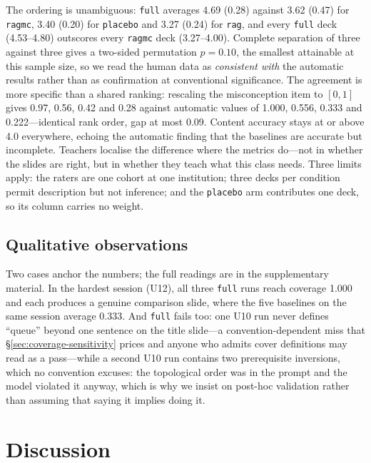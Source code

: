 \documentclass[review,12pt]{elsarticle}
\renewcommand{\_}{\kgunderscore\allowbreak}
\newcommand{\id}[1]{\texttt{#1}}
\begin{document}
The ordering is unambiguous: \id{full} averages 4.69 (0.28) against 3.62 (0.47)
for \id{rag\_mc}, 3.40 (0.20) for \id{placebo} and 3.27 (0.24) for \id{rag},
and every \id{full} deck (4.53--4.80) outscores every \id{rag\_mc} deck
(3.27--4.00). Complete separation of three against three gives a two-sided
permutation $p=0.10$, the smallest attainable at this sample size, so we read
the human data as \emph{consistent with} the automatic results rather than as
confirmation at conventional significance. The agreement is more specific than
a shared ranking: rescaling the misconception item to $[0,1]$ gives 0.97, 0.56,
0.42 and 0.28 against automatic values of 1.000, 0.556, 0.333 and
0.222---identical rank order, gap at most 0.09. Content accuracy stays at or
above 4.0 everywhere, echoing the automatic finding that the baselines are
accurate but incomplete. Teachers localise the difference where the metrics
do---not in whether the slides are right, but in whether they teach what this
class needs. Three limits apply: the raters are one cohort at one institution;
three decks per condition permit description but not inference; and the
\id{placebo} arm contributes one deck, so its column carries no weight.

\subsection{Qualitative observations}
\label{sec:qualitative}

Two cases anchor the numbers; the full readings are in the supplementary
material. In the hardest session (U12), all three \id{full} runs reach coverage
1.000 and each produces a genuine comparison slide, where the five baselines on
the same session average 0.333. And \id{full} fails too: one U10 run
never defines ``queue'' beyond one sentence on the title slide---a
convention-dependent miss that \S\ref{sec:coverage-sensitivity} prices and anyone
who admits cover definitions may read as a pass---while a second U10 run contains
two prerequisite inversions, which no convention excuses: the topological order
was in the prompt and the model violated it anyway, which is why we insist on
post-hoc validation rather than assuming that saying it implies doing it.


\section{Discussion}
\end{document}
